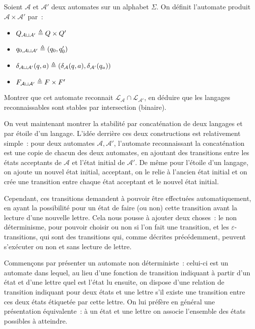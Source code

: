 \begin{exercise}
  Soient $\mathcal A$ et $\mathcal A'$ deux automates sur un alphabet $\Sigma$.
  On définit l'automate produit $\mathcal A \times \mathcal A'$ par~:
  \begin{itemize}
  \item $Q_{\mathcal A\sqcup \mathcal A'} \triangleq Q\times Q'$
  \item $q_{0,\mathcal A\sqcup \mathcal A'} \triangleq (q_0,q'_0)$
  \item $\delta_{\mathcal A \sqcup \mathcal A'}(q,a) \triangleq (\delta_{\mathcal A}(q,a),
    \delta_{\mathcal A'}(q_a))$
  \item $F_{\mathcal A \sqcup \mathcal A'} \triangleq F\times F'$
  \end{itemize}

  Montrer que cet automate reconnait
  $\mathcal L_\mathcal A \cap \mathcal L_{\mathcal A'}$, en déduire que les
  langages reconnaissables sont stables par intersection (binaire).
\end{exercise}

On veut maintenant montrer la stabilité par concaténation de deux langages et
par étoile d'un langage. L'idée derrière ces deux constructions est relativement
simple~: pour deux automates $\mathcal A,\mathcal A'$, l'automate reconnaissant
la concaténation est une copie de chacun des deux automates, en ajoutant des
transitions entre les états acceptants de $\mathcal A$ et l'état initial de
$\mathcal A'$. De même pour l'étoile d'un langage, on ajoute un nouvel état
initial, acceptant, on le relie à l'ancien état initial et on crée une
transition entre chaque état acceptant et le nouvel état initial.

Cependant, ces transitions demandent à pouvoir être effectuées automatiquement,
en ayant la possibilité pour un état de faire (ou non) cette transition avant
la lecture d'une nouvelle lettre. Cela nous pousse à ajouter deux choses~: le
non déterminisme, pour pouvoir choisir ou non si l'on fait une transition, et
les $\varepsilon$-transitions, qui sont des transitions qui, comme décrites
précédemment, peuvent s'exécuter ou non et sans lecture de lettre.

Commençons par présenter un automate non déterministe~: celui-ci est un automate
dans lequel, au lieu d'une fonction de transition indiquant à partir d'un état
et d'une lettre quel est l'état lu ensuite, on dispose d'une relation de
transition indiquant pour deux états et une lettre s'il existe une transition
entre ces deux états étiquetée par cette lettre. On lui préfère en général une
présentation équivalente~: à un état et une lettre on associe l'ensemble des
états possibles à atteindre.

